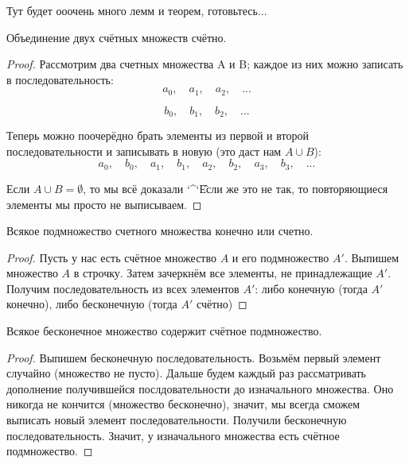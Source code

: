 Тут будет ооочень много лемм и теорем, готовьтесь...

\begin{lemma} \thmslashn

	Объединение двух счётных множеств счётно.
	
	\begin{proof} \thmslashn
	
		Рассмотрим два счетных множества A и B; каждое из них можно записать в последовательность:
		\[a_0, \quad a_1, \quad a_2, \quad ...\]
		
		\[b_0, \quad b_1, \quad b_2, \quad ...\]
		
		Теперь можно поочерёдно брать элементы из первой и второй последовательности и записывать в новую (это даст нам $A \cup B$):
		\[a_0, \quad b_0, \quad a_1, \quad b_1, \quad a_2, \quad b_2, \quad a_3, \quad b_3, \quad ...\]
		
		Если $A \cup B = \emptyset$, то мы всё доказали \char`\^\char`\^
		
		Если же это не так, то повторяющиеся элементы мы просто не выписываем.
	\end{proof}
\end{lemma}

\begin{lemma} \thmslashn

	Всякое подмножество счетного множества конечно или счетно.
	\begin{proof} \thmslashn
	
		Пусть у нас есть счётное множество $A$ и его подмножество $A'$. Выпишем множество $A$ в строчку. Затем зачеркнём все элементы, не принадлежащие $A'$. Получим последовательность из всех элементов $A'$: либо конечную (тогда $A'$ конечно), либо бесконечную (тогда $A'$ счётно)
	\end{proof}
\end{lemma}

\begin{lemma} \thmslashn

	Всякое бесконечное множество содержит счётное подмножество.
	\begin{proof} \thmslashn
	
		Выпишем бесконечную последовательность. Возьмём первый элемент случайно (множество не пусто). Дальше будем каждый раз рассматривать дополнение получившейся послдовательности до изначального множества. Оно никогда не кончится (множество бесконечно), значит, мы всегда сможем выписать новый элемент последовательности. Получили бесконечную последовательность. Значит, у изначального множества есть счётное подмножество.
	\end{proof}
\end{lemma}

